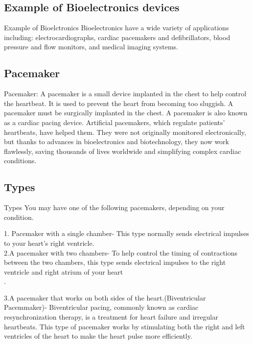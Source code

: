 \documentclass[12pt]{report}
\begin{document}
\subsection{Example of Bioelectronics devices}
	Example of Bioelctronics
Bioelectronics have a wide variety of applications including: 
 electrocardiographs, cardiac pacemakers and defibrillators, blood pressure and flow monitors, and medical imaging systems.\\
 
\subsection{Pacemaker}

Pacemaker: A pacemaker is a small device implanted in the chest to help control the heartbeat. It is used to prevent the heart from becoming too sluggish. A pacemaker must be surgically implanted in the chest. A pacemaker is also known as a cardiac pacing device. Artificial pacemakers, which regulate patients' heartbeats, have helped them. They were not originally monitored electronically, but thanks to advances in bioelectronics and biotechnology, they now work flawlessly, saving thousands of lives worldwide and simplifying complex cardiac conditions.
	
\subsection{Types}

Types
You may have one of the following pacemakers, depending on your condition.

1. Pacemaker with a single chamber- This type normally sends electrical impulses to your heart's right ventricle.\\

2.A pacemaker with two chambers- To help control the timing of contractions between the two chambers, this type sends electrical impulses to the right ventricle and right atrium of your heart\\.

3.A pacemaker that works on both sides of the heart.(Biventricular Pacemmaker)- Biventricular pacing, commonly known as cardiac resynchronization therapy, is a treatment for heart failure and irregular heartbeats. This type of pacemaker works by stimulating both the right and left ventricles of the heart to make the heart pulse more efficiently.\\

\clearpage
\end{document}
